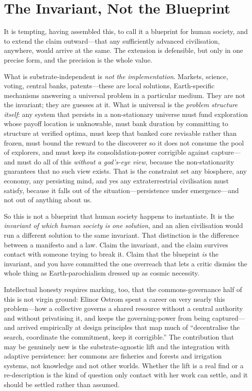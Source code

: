 \documentclass{article}
\begin{document}
\section*{The Invariant, Not the Blueprint}

It is tempting, having assembled this, to call it a blueprint for human society, and to extend the claim outward---that any sufficiently advanced civilisation, anywhere, would arrive at the same. The extension is defensible, but only in one precise form, and the precision is the whole value.

What is substrate-independent is \textit{not the implementation}. Markets, science, voting, central banks, patents---these are local solutions, Earth-specific mechanisms answering a universal problem in a particular medium. They are not the invariant; they are guesses at it. What is universal is the \textit{problem structure itself}: any system that persists in a non-stationary universe must fund exploration whose payoff location is unknowable, must bank duration by committing to structure at verified optima, must keep that banked core revisable rather than frozen, must bound the reward to the discoverer so it does not consume the pool of explorers, and must keep its consolidation-power corrigible against capture---and must do all of this \textit{without a god's-eye view}, because the non-stationarity guarantees that no such view exists. That is the constraint set any biosphere, any economy, any persisting mind, and yes any extraterrestrial civilisation must satisfy, because it falls out of the situation---persistence under emergence---and not out of anything about us.

So this is not a blueprint that human society happens to instantiate. It is the \textit{invariant of which human society is one solution}, and an alien civilisation would run a different solution to the same invariant. That distinction is the difference between a manifesto and a law. Claim the invariant, and the claim survives contact with someone trying to break it. Claim that the blueprint \textit{is} the invariant, and you have committed the one overreach that lets a critic dismiss the whole thing as Earth-parochialism dressed up as cosmic necessity.

Intellectual honesty requires marking, too, that the commons-governance half of this is not virgin ground: Elinor Ostrom spent a career on very nearly this problem---how a collective governs a shared resource without a central authority and without privatising it, and keeps the governing-power from being captured---and arrived empirically at design principles that map much of ``decentralise the search, coordinate the commitment, keep it corrigible.'' The contribution that may be genuinely new is the substrate-agnostic lift and the integration with adaptive persistence: her commons are fisheries and forests and irrigation systems, not knowledge and not other worlds. Whether the lift is a real find or a re-description is the kind of question only contact with her work can settle, and it should be settled rather than assumed.
\end{document}

